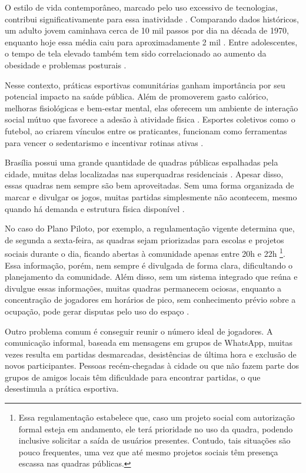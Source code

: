   O estilo de vida contemporâneo, marcado pelo uso excessivo de tecnologias, contribui significativamente para essa inatividade \cite{saraiva2024}. Comparando dados históricos, um adulto jovem caminhava cerca de 10 mil passos por dia na década de 1970, enquanto hoje essa média caiu para aproximadamente 2 mil \cite{saraiva2024}. Entre adolescentes, o tempo de tela elevado também tem sido correlacionado ao aumento da obesidade e problemas posturais \cite{saraiva2024}.

  Nesse contexto, práticas esportivas comunitárias ganham importância por seu potencial impacto na saúde pública. Além de promoverem gasto calórico, melhoras fisiológicas e bem-estar mental, elas oferecem um ambiente de interação social mútuo que favorece a adesão à atividade física \cite{ministerio2023}. Esportes coletivos como o futebol, ao criarem vínculos entre os praticantes, funcionam como ferramentas para vencer o sedentarismo e incentivar rotinas ativas \cite{ministerio2023,carbinatto2022}.

  Brasília possui uma grande quantidade de quadras públicas espalhadas pela cidade, muitas delas localizadas nas superquadras residenciais \cite{segov2023}. Apesar disso, essas quadras nem sempre são bem aproveitadas. Sem uma forma organizada de marcar e divulgar os jogos, muitas partidas simplesmente não acontecem, mesmo quando há demanda e estrutura física disponível \cite{ipea2021}.

  No caso do Plano Piloto, por exemplo, a regulamentação vigente determina que, de segunda a sexta-feira, as quadras sejam priorizadas para escolas e projetos sociais durante o dia, ficando abertas à comunidade apenas entre 20h e 22h \cite{peixoto2025}\footnote{Essa regulamentação estabelece que, caso um projeto social com autorização formal esteja em andamento, ele terá prioridade no uso da quadra, podendo inclusive solicitar a saída de usuários presentes. Contudo, tais situações são pouco frequentes, uma vez que até mesmo projetos sociais têm presença escassa nas quadras públicas.}. Essa informação, porém, nem sempre é divulgada de forma clara, dificultando o planejamento da comunidade. Além disso, sem um sistema integrado que reúna e divulgue essas informações, muitas quadras permanecem ociosas, enquanto a concentração de jogadores em horários de pico, sem conhecimento prévio sobre a ocupação, pode gerar disputas pelo uso do espaço \cite{agenciabrasilia2025}.

  Outro problema comum é conseguir reunir o número ideal de jogadores. A comunicação informal, baseada em mensagens em grupos de WhatsApp, muitas vezes resulta em partidas desmarcadas, desistências de última hora e exclusão de novos participantes. Pessoas recém-chegadas à cidade ou que não fazem parte dos grupos de amigos locais têm dificuldade para encontrar partidas, o que desestimula a prática esportiva.

